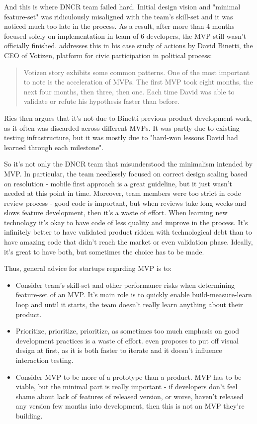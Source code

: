 \documentclass{article}
\begin{document}
And this is where DNCR team failed hard. Initial design vision and "minimal feature-set" was ridiculously misaligned with the team's skill-set and it was noticed much too late in the process. As a result, after more than 4 months focused solely on implementation in team of 6 developers, the MVP still wasn't officially finished. \cite{ries2011lean} addresses this in his case study of actions by David Binetti, the CEO of Votizen, platform for civic participation in political process:
\begin{quote}
Votizen story exhibits some common patterns. One of the most important to note is the acceleration of MVPs. The first MVP took eight months, the next four months, then three, then one. Each time David was able to validate or refute his hypothesis faster than before. 
\end{quote}
Ries then argues that it's not due to Binetti previous product development work, as it often was discarded across different MVPs. It was partly due to existing testing infrastructure, but it was mostly due to "hard-won lessons David had learned through each milestone".

So it's not only the DNCR team that misunderstood the minimalism intended by MVP. In particular, the team needlessly focused on correct design scaling based on resolution - mobile first approach is a great guideline, but it just wasn't needed at this point in time. Moreover, team members were too strict in code review process - good code is important, but when reviews take long weeks and slows feature development, then it's a waste of effort. When learning new technology it's okay to have code of less quality and improve in the process. It's infinitely better to have validated product ridden with technological debt than to have amazing code that didn't reach the market or even validation phase. Ideally, it's great to have both, but sometimes the choice has to be made.

Thus, general advice for startups regarding MVP is to:
\begin{itemize}
\item Consider team's skill-set and other performance risks when determining feature-set of an MVP. It's main role is to quickly enable build-measure-learn loop and until it starts, the team doesn't really learn anything about their product.
\item Prioritize, prioritize, prioritize, as sometimes too much emphasis on good development practices is a waste of effort. \cite{klein2013ux} even proposes to put off visual design at first, as it is both faster to iterate and it doesn't influence interaction testing.
\item Consider MVP to be more of a prototype than a product. MVP has to be viable, but the minimal part is really important - if developers don't feel shame about lack of features of released version, or worse, haven't released any version few months into development, then this is not an MVP they're building.
\end{itemize}
\end{document}
